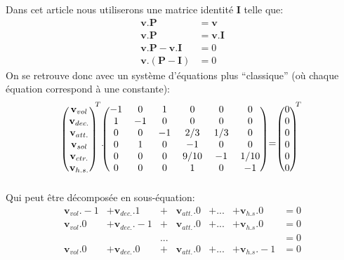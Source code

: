 \documentclass[letterpaper]{article}
\begin{document}
      Dans cet article nous utiliserons une matrice identité $\mathbf{I}$ telle que:
      \begin{align*}
       \mathbf{v} . \mathbf{P} &= \mathbf{v}\\
       \mathbf{v} . \mathbf{P} &= \mathbf{v} . \mathbf{I}\\
       \mathbf{v} . \mathbf{P} - \mathbf{v}. \mathbf{I} &= 0\\
       \mathbf{v} . (\mathbf{P} - \mathbf{I}) &= 0
      \end{align*}
      On se retrouve donc avec un système d'équations plus ``classique'' (où chaque 
      équation correspond à une constante):
      $$\begin{blockarray}{(c)}
	  \mathbf{v}_{vol}\\
	  \mathbf{v}_{dec.}\\
	  \mathbf{v}_{att.}\\
	  \mathbf{v}_{sol}\\
	  \mathbf{v}_{ctr.}\\
	  \mathbf{v}_{h.s.}
	\end{blockarray}^T .
	\begin{blockarray}{(cccccc)}
	    -1 & 0  & 1  & 0    & 0   & 0    \\
	    1  & -1 & 0  & 0    & 0   & 0    \\
	    0  & 0  & -1 & 2/3  & 1/3 & 0    \\
	    0  & 1  & 0  & -1   & 0   & 0    \\
	    0  & 0  & 0  & 9/10 & -1  & 1/10 \\
	    0  & 0  & 0  & 1    & 0   & -1    \\
	\end{blockarray}
	= 
	\begin{blockarray}{(c)}
	  0\\
	  0\\
	  0\\
	  0\\
	  0\\
	  0
	\end{blockarray}^T$$
      Qui peut être décomposée en sous-équation:
      \begin{align*}
       \mathbf{v}_{vol} . -1 &+ \mathbf{v}_{dec.} . 1 &+ &\mathbf{v}_{att.} . 0 &+ ... &+ \mathbf{v}_{h.s} . 0 &= 0\\
       \mathbf{v}_{vol} . 0 &+ \mathbf{v}_{dec.} . -1 &+ &\mathbf{v}_{att.} . 0 &+ ... &+ \mathbf{v}_{h.s} . 0 &= 0\\
       & & ... & & & &= 0\\
       \mathbf{v}_{vol} . 0 &+ \mathbf{v}_{dec.} . 0 &+ &\mathbf{v}_{att.} . 0 &+ ... &+ \mathbf{v}_{h.s} . -1 &= 0\\
      \end{align*}
\end{document}
